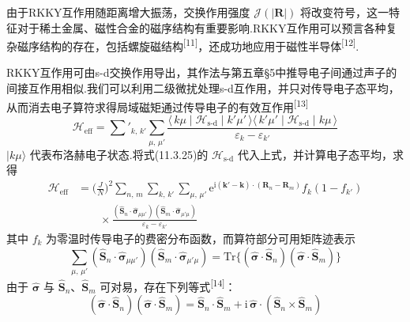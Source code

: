 由于RKKY互作用随距离增大振荡，交换作用强度 $\mathscr{J}(|\boldsymbol{R}|)$ 将改变符号，这一特征对于稀土金属、磁性合金的磁序结构有重要影响.RKKY互作用可以预言各种复杂磁序结构的存在，包括螺旋磁结构\textsuperscript{[11]}，还成功地应用于磁性半导体\textsuperscript{[12]}.

RKKY互作用可由s-d交换作用导出，其作法与第五章§5中推导电子间通过声子的间接互作用相似.我们可以利用二级微扰处理s-d互作用，并只对传导电子态平均，从而消去电子算符求得局域磁矩通过传导电子的有效互作用\textsuperscript{[13]}
\begin{equation}
  \mathscr{H}_{\mathrm{eff}}=\sum'_{k,\,k'}\sum_{\mu,\,\mu'}
  \frac{\langle\,k\mu\mid\mathscr{H}_{\mathrm{s}\text{-}\mathrm{d}}\mid k'\mu'\,\rangle
  \langle\,k'\mu'\mid\mathscr{H}_{\mathrm{s}\text{-}\mathrm{d}}\mid k\mu\,\rangle}
  {\varepsilon_{k}-\varepsilon_{k'}}
\end{equation}
$|k\mu\rangle$ 代表布洛赫电子状态.将式(11.3.25)的 $\mathscr{H}_{\mathrm{s}\text{-}\mathrm{d}}$ 代入上式，并计算电子态平均，求得
\begin{equation}
\begin{aligned}
  \mathscr{H}_{\mathrm{eff}}
  &=\biggl(\frac{J}{N}\biggr)^{2}\sum_{n,\,m}\sum_{k,\,k'}\sum_{\mu,\,\mu'}
  \mathrm{e}^{\mathrm{i}(\boldsymbol{k}'-\boldsymbol{k})\cdot(\boldsymbol{R}_{n}-\boldsymbol{R}_{m})}
  f_{k}(1-f_{k'})\\
  &\qquad\times\frac{(\hat{\boldsymbol{S}}_{n}\cdot\hat{\boldsymbol{\sigma}}_{\mu\mu'})
  (\hat{\boldsymbol{S}}_{m}\cdot\hat{\boldsymbol{\sigma}}_{\mu'\mu})}
  {\varepsilon_{k}-\varepsilon_{k'}}
\end{aligned}
\end{equation}
其中 $f_{k}$ 为零温时传导电子的费密分布函数，而算符部分可用矩阵迹表示
\begin{equation}
  \sum_{\mu,\,\mu'}
  (\hat{\boldsymbol{S}}_{n}\cdot\hat{\boldsymbol{\sigma}}_{\mu\mu'})
  (\hat{\boldsymbol{S}}_{m}\cdot\hat{\boldsymbol{\sigma}}_{\mu'\mu})
  =\mathrm{Tr}\{(\hat{\boldsymbol{\sigma}}\cdot\hat{\boldsymbol{S}}_{n})
  (\hat{\boldsymbol{\sigma}}\cdot\hat{\boldsymbol{S}}_{m})\}
\end{equation}
由于 $\hat{\boldsymbol{\sigma}}$ 与 $\hat{\boldsymbol{S}}_{n}$、$\hat{\boldsymbol{S}}_{m}$ 可对易，存在下列等式\textsuperscript{[14]}：
\begin{equation}
  (\hat{\boldsymbol{\sigma}}\cdot\hat{\boldsymbol{S}}_{n})
  (\hat{\boldsymbol{\sigma}}\cdot\hat{\boldsymbol{S}}_{m})
  =\hat{\boldsymbol{S}}_{n}\cdot\hat{\boldsymbol{S}}_{m}
  +\mathrm{i}\,\hat{\boldsymbol{\sigma}}\cdot
  (\hat{\boldsymbol{S}}_{n}\times\hat{\boldsymbol{S}}_{m})
\end{equation}
